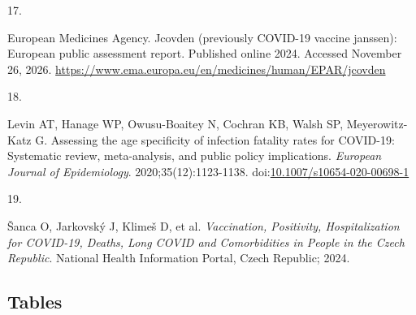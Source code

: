\documentclass[
]{article}
\newlength{\cslhangindent}
\newlength{\csllabelwidth}
\newenvironment{CSLReferences}[2] %
 {\begin{list}{}{%
  \setlength{\itemindent}{0pt}
  \setlength{\leftmargin}{0pt}
  \setlength{\parsep}{0pt}
  \ifodd #1
   \setlength{\leftmargin}{\cslhangindent}
   \setlength{\itemindent}{-1\cslhangindent}
  \fi
  \setlength{\itemsep}{#2\baselineskip}}}
 {\end{list}}
\newcommand{\CSLLeftMargin}[1]{\parbox[t]{\csllabelwidth}{\strut#1\strut}}
\newcommand{\CSLRightInline}[1]{\parbox[t]{\linewidth - \csllabelwidth}{\strut#1\strut}}
\begin{document}
\begin{CSLReferences}{0}{1}
\CSLLeftMargin{17. }%
\CSLRightInline{European Medicines Agency. Jcovden (previously COVID-19 vaccine janssen): European public assessment report. Published online 2024. Accessed November 26, 2026. \url{https://www.ema.europa.eu/en/medicines/human/EPAR/jcovden}}

\CSLLeftMargin{18. }%
\CSLRightInline{Levin AT, Hanage WP, Owusu-Boaitey N, Cochran KB, Walsh SP, Meyerowitz-Katz G. Assessing the age specificity of infection fatality rates for {COVID-19}: Systematic review, meta-analysis, and public policy implications. \emph{European Journal of Epidemiology}. 2020;35(12):1123-1138. doi:\href{https://doi.org/10.1007/s10654-020-00698-1}{10.1007/s10654-020-00698-1}}

\CSLLeftMargin{19. }%
\CSLRightInline{Šanca O, Jarkovský J, Klimeš D, et al. \emph{Vaccination, Positivity, Hospitalization for {COVID-19}, Deaths, Long {COVID} and Comorbidities in People in the {Czech Republic}}. National Health Information Portal, Czech Republic; 2024.}

\end{CSLReferences}

\newpage

\subsection{Tables}\label{tables}
\end{document}
